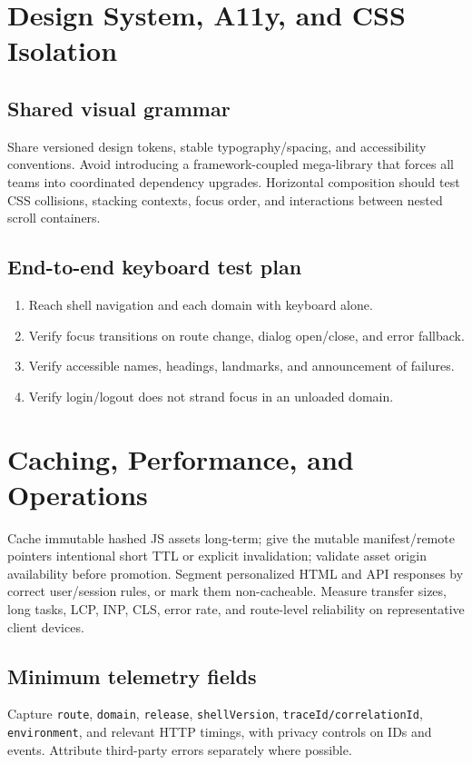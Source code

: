 \documentclass[11pt,letterpaper,oneside]{report}
\begin{document}
\chapter{Design System, A11y, and CSS Isolation}
\section{Shared visual grammar}
Share versioned design tokens, stable typography/spacing, and accessibility conventions. Avoid introducing a framework-coupled mega-library that forces all teams into coordinated dependency upgrades. Horizontal composition should test CSS collisions, stacking contexts, focus order, and interactions between nested scroll containers.
\section{End-to-end keyboard test plan}
\begin{enumerate}\item Reach shell navigation and each domain with keyboard alone.
\item Verify focus transitions on route change, dialog open/close, and error fallback.
\item Verify accessible names, headings, landmarks, and announcement of failures.
\item Verify login/logout does not strand focus in an unloaded domain.\end{enumerate}
\chapter{Caching, Performance, and Operations}
Cache immutable hashed JS assets long-term; give the mutable manifest/remote pointers intentional short TTL or explicit invalidation; validate asset origin availability before promotion. Segment personalized HTML and API responses by correct user/session rules, or mark them non-cacheable. Measure transfer sizes, long tasks, LCP, INP, CLS, error rate, and route-level reliability on representative client devices.
\section{Minimum telemetry fields}
Capture \texttt{route}, \texttt{domain}, \texttt{release}, \texttt{shellVersion}, \texttt{traceId/correlationId}, \texttt{environment}, and relevant HTTP timings, with privacy controls on IDs and events. Attribute third-party errors separately where possible.
\end{document}
